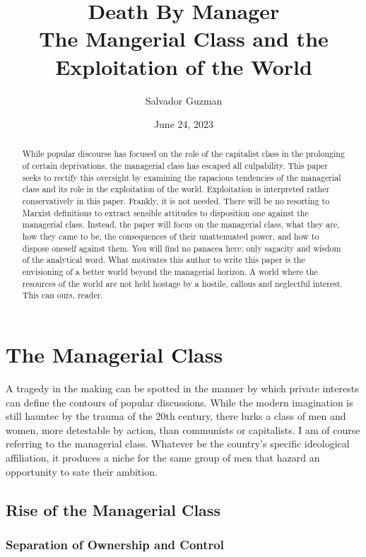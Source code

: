 \documentclass[12pt]{article}
\title{
 Death By Manager \\
 \large The Mangerial Class and the Exploitation of the World}
\author{Salvador Guzman}
\date{June 24, 2023}
\begin{document}
\maketitle
\pagebreak

\begin{abstract}
    While popular discourse has focused on the role of the capitalist class in the prolonging of certain deprivations, the managerial class has escaped all culpability.
    This paper seeks to rectify this oversight by examining the rapacious tendencies of the managerial class and its role in the exploitation of the world.
    Exploitation is interpreted rather conservatively in this paper.
    Frankly, it is not needed.
    There will be no resorting to Marxist definitions to extract sensible attitudes to disposition one against the managerial class. Instead, the paper will focus on the managerial class, what they are, how they came to be, the consequences of their unattenuated power, and how to dispose oneself against them.
    You will find no panacea here; only sagacity and wisdom of the analytical word. What motivates this author to write this paper is the envisioning of a better world beyond the managerial horizon.
    A world where the resources of the world are not held hostage by a hostile, callous and neglectful interest.
    This can ours, reader.
\end{abstract}
\pagebreak
\tableofcontents
\pagebreak

\section{The Managerial Class}
A tragedy in the making can be spotted in the manner by which private interests can define the contours of popular discussions.
While the modern imagination is still hauntec by the trauma of the 20th century, there lurks a class of men and women, more detestable by action, than communists or capitalists.
I am of course referring to the managerial class.
Whatever be the country's specific ideological affiliation, it produces a niche for the same group of men that hazard an opportunity to sate their ambition.


\subsection{Rise of the Managerial Class}
\subsubsection{Separation of Ownership and Control}
\end{document}
